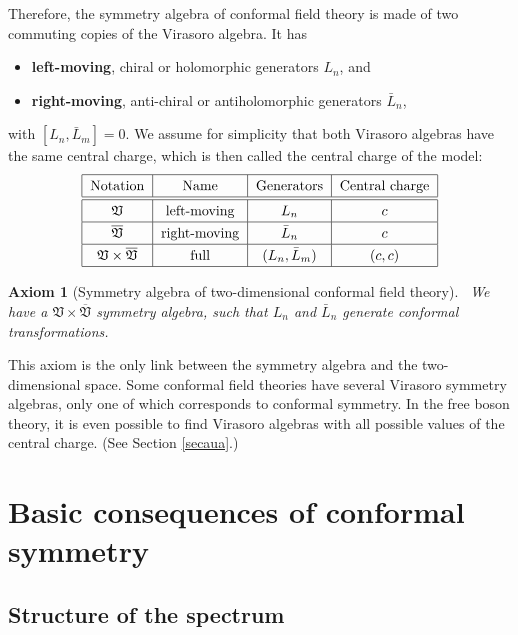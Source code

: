 \documentclass[12pt, a4paper, notitlepage, twoside]{report}
\numberwithin{equation}{section}
\theoremstyle{break}
\newtheorem{hyp}{Axiom}[chapter]
\begin{document}
Therefore, the symmetry algebra of conformal field theory is made of two commuting copies of the Virasoro algebra. It has
\begin{itemize}
 \item \textbf{\boldmath left-moving}, chiral or holomorphic
generators $L_n$,  and
\item  \textbf{\boldmath right-moving}, anti-chiral or antiholomorphic generators $\bar{L}_n$,
\end{itemize}
 with
$[L_n,\bar{L}_m]=0$.
We assume for simplicity that both Virasoro algebras have the same central charge, which is then called the central charge of the model:
\begin{align}
\renewcommand{\arraystretch}{1.3}
 \begin{tabular}{|c|c|c|c|}
 \hline
Notation &  Name & Generators &  Central\ charge
\\
\hline\hline
 $\mathfrak{V}$ & left-moving & $L_n$ & $c$
\\
\hline
$\overline{\mathfrak{V}}$ & right-moving & $\bar{L}_n$ & $c$
\\
\hline
$\mathfrak{V}\times \overline{\mathfrak{V}}$ & full & $(L_n,\bar{L}_m)$ & $(c,c)$
\\  
\hline
 \end{tabular}
\end{align}

\begin{hyp}[Symmetry algebra of two-dimensional conformal field theory]
 ~\label{ax:sa}
 We have a $\mathfrak{V}\times \overline{\mathfrak{V}}$ symmetry algebra, such that $L_n$ and $\bar{L}_n$ generate conformal transformations. 
\end{hyp} 
\noindent
This axiom is the only link between the symmetry algebra and the two-dimensional space.
Some conformal field theories have several Virasoro symmetry algebras, only one of which corresponds to conformal symmetry.
In the free boson theory, it is even possible to find Virasoro algebras with all possible values of the central charge. (See Section \ref{secaua}.)


\section{Basic consequences of conformal symmetry}

\subsection{Structure of the spectrum \label{secsots}}
\end{document}
